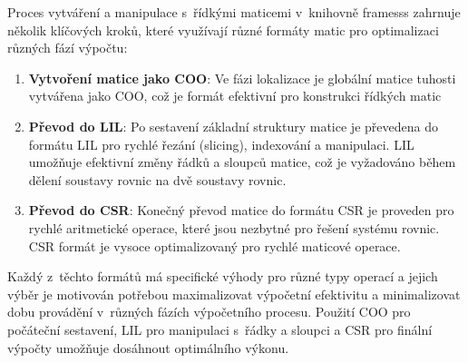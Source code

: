Proces vytváření a manipulace s~řídkými maticemi v~knihovně framesss zahrnuje několik klíčových kroků, které využívají různé formáty matic pro optimalizaci různých fází výpočtu:

\begin{enumerate}
    \item \textbf{Vytvoření matice jako COO}: Ve fázi lokalizace je globální matice tuhosti vytvářena jako COO, což je formát efektivní pro konstrukci řídkých matic
    
    \item \textbf{Převod do LIL}: Po sestavení základní struktury matice je převedena do formátu LIL pro rychlé řezání (slicing), indexování a manipulaci. LIL umožňuje efektivní změny řádků a sloupců matice, což je vyžadováno během dělení soustavy rovnic na dvě soustavy rovnic.
    
    \item \textbf{Převod do CSR}: Konečný převod matice do formátu CSR je proveden pro rychlé aritmetické operace, které jsou nezbytné pro  řešení systému rovnic. CSR formát je vysoce optimalizovaný pro rychlé maticové operace.
\end{enumerate}

Každý z~těchto formátů má specifické výhody pro různé typy operací a jejich výběr je motivován potřebou maximalizovat výpočetní efektivitu a minimalizovat dobu provádění v~různých fázích výpočetního procesu. Použití COO pro počáteční sestavení, LIL pro manipulaci s~řádky a sloupci a CSR pro finální výpočty umožňuje dosáhnout optimálního výkonu.
